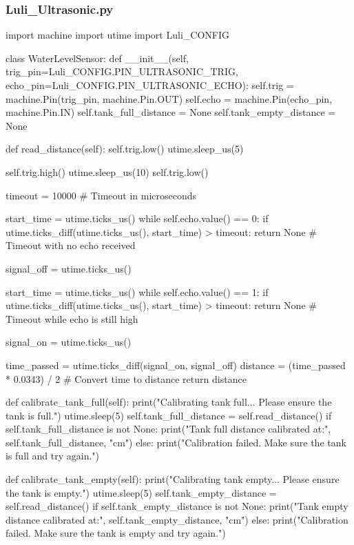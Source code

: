 \documentclass[12pt]{article} %
\begin{document}
\subsubsection{Luli\_Ultrasonic.py}
\begin{pythoncode}[caption={Pico W Ultrasonic Sensor Code}]
    import machine
    import utime
    import Luli_CONFIG
    
    class WaterLevelSensor:
        def __init__(self, trig_pin=Luli_CONFIG.PIN_ULTRASONIC_TRIG, echo_pin=Luli_CONFIG.PIN_ULTRASONIC_ECHO):
            self.trig = machine.Pin(trig_pin, machine.Pin.OUT)
            self.echo = machine.Pin(echo_pin, machine.Pin.IN)
            self.tank_full_distance = None
            self.tank_empty_distance = None
    
        def read_distance(self):
            self.trig.low()
            utime.sleep_us(5)
    
            self.trig.high()
            utime.sleep_us(10)
            self.trig.low()
    
            timeout = 10000  # Timeout in microseconds
    
            start_time = utime.ticks_us()
            while self.echo.value() == 0:
                if utime.ticks_diff(utime.ticks_us(), start_time) > timeout:
                    return None  # Timeout with no echo received
    
            signal_off = utime.ticks_us()
    
            start_time = utime.ticks_us()
            while self.echo.value() == 1:
                if utime.ticks_diff(utime.ticks_us(), start_time) > timeout:
                    return None  # Timeout while echo is still high
    
            signal_on = utime.ticks_us()
    
            time_passed = utime.ticks_diff(signal_on, signal_off)
            distance = (time_passed * 0.0343) / 2  # Convert time to distance
            return distance
    
        def calibrate_tank_full(self):
            print("Calibrating tank full... Please ensure the tank is full.")
            utime.sleep(5)
            self.tank_full_distance = self.read_distance()
            if self.tank_full_distance is not None:
                print("Tank full distance calibrated at:", self.tank_full_distance, "cm")
            else:
                print("Calibration failed. Make sure the tank is full and try again.")
    
        def calibrate_tank_empty(self):
            print("Calibrating tank empty... Please ensure the tank is empty.")
            utime.sleep(5)
            self.tank_empty_distance = self.read_distance()
            if self.tank_empty_distance is not None:
                print("Tank empty distance calibrated at:", self.tank_empty_distance, "cm")
            else:
                print("Calibration failed. Make sure the tank is empty and try again.")
    

\end{pythoncode}
\end{document}
